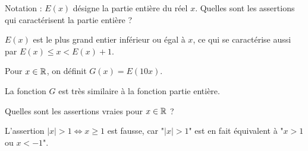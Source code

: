 \begin{question}

Notation : $E(x)$ désigne la partie entière du réel $x$.
Quelles sont les assertions qui caractérisent la partie entière ?
\begin{answers}



\end{answers}
\begin{explanations}
$E(x)$ est le plus grand entier inférieur ou égal à $x$, ce qui se caractérise aussi par $E(x) \le x < E(x)+1$.
\end{explanations}
\end{question}


\begin{question}

Pour $x\in \mathbb{R}$, on définit $G(x) = E(10x)$.
\begin{answers}




\end{answers}
\begin{explanations}
La fonction $G$ est très similaire à la fonction partie entière.
\end{explanations}
\end{question}


\begin{question}

Quelles sont les assertions vraies pour $x\in\mathbb{R}$ ?
\begin{answers}



\end{answers}
\begin{explanations}
L'assertion $|x|>1 \iff x \ge 1$ est fausse, car  "$|x| >1$" est en fait équivalent à "$x>1$ ou $x<-1$".
\end{explanations}
\end{question}


